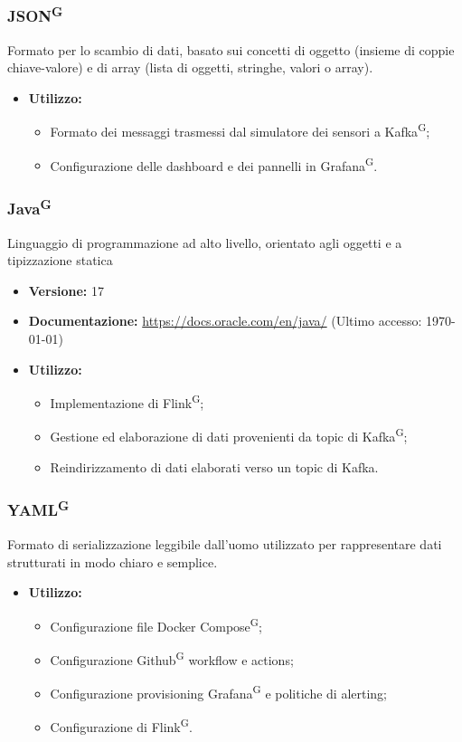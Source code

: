 \documentclass[8pt]{article}
\newcommand{\glossterm}[1]{#1\textsuperscript{G}} %
\begin{document}
\subsubsection{\glossterm{JSON}}
Formato per lo scambio di dati, basato sui concetti di oggetto (insieme di coppie chiave-valore) e di array (lista di oggetti, stringhe, valori o array).
\begin{itemize}
    \item \textbf{Utilizzo:}
    \begin{itemize}
        \item Formato dei messaggi trasmessi dal simulatore dei sensori a \glossterm{Kafka};
        \item Configurazione delle dashboard e dei pannelli in \glossterm{Grafana}.
    \end{itemize}
\end{itemize}
\subsubsection{\glossterm{Java}}
Linguaggio di programmazione ad alto livello, orientato agli oggetti e a tipizzazione statica
\begin{itemize}
    \item \textbf{Versione:} 17
    \item \textbf{Documentazione:} \href{https://docs.oracle.com/en/java/}{\color{myblue}https://docs.oracle.com/en/java/} (Ultimo accesso: \today)
    \item \textbf{Utilizzo:}
    \begin{itemize}
        \item Implementazione di \glossterm{Flink};
        \item Gestione ed elaborazione di dati provenienti da topic di \glossterm{Kafka};
        \item Reindirizzamento di dati elaborati verso un topic di Kafka.
    \end{itemize}
\end{itemize}
\subsubsection{\glossterm{YAML}}
Formato di serializzazione leggibile dall’uomo utilizzato per rappresentare dati strutturati in modo chiaro e semplice.
\begin{itemize}
    \item \textbf{Utilizzo:}
    \begin{itemize}
        \item Configurazione file \glossterm{Docker Compose};
        \item Configurazione \glossterm{Github} workflow e actions; 
        \item Configurazione provisioning \glossterm{Grafana} e politiche di alerting;
        \item Configurazione di \glossterm{Flink}.
    \end{itemize}
\end{itemize}
\end{document}
